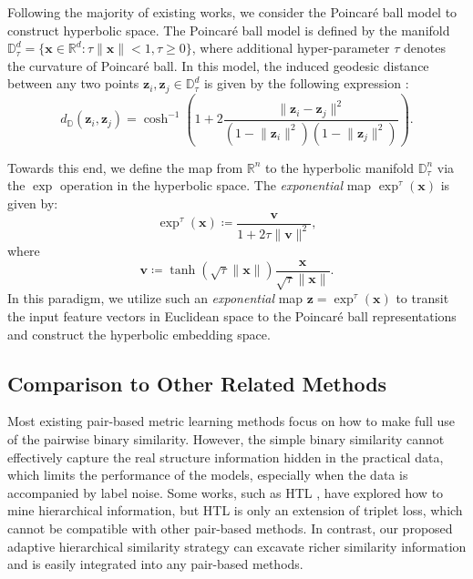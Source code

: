 \documentclass[lettersize,journal]{IEEEtran}
\begin{document}
Following the majority of existing works, we consider the Poincar{\'e} ball model to construct hyperbolic
space. The Poincar{\'e} ball model is defined by the manifold $\mathbb{D}_{\tau}^d = \lbrace \mathbf{x} \in \mathbb{R}^d: \tau\lVert\mathbf{x} \rVert < 1, \tau\geq 0\rbrace$, where additional hyper-parameter $\tau$ denotes    the curvature of Poincar{\'e} ball. In this model, the induced geodesic distance between any two points $\mathbf{z}_i, \mathbf{z}_j \in \mathbb{D}_{\tau}^d$  is given by the following expression \cite{nickel2017poincare}:
\begin{equation}
	d_{\mathbb{D}}(\mathbf{z}_i,\mathbf{z}_j) = \cosh^{-1}\left( 1 + 2\frac{\lVert \mathbf{z}_i - \mathbf{z}_j \rVert^2}{(1- \lVert \mathbf{z}_i\rVert^2)(1- \lVert \mathbf{z}_j\rVert^2)} \right).
\end{equation}

Towards this end, we define the  map from $\mathbb{R}^n$ to the hyperbolic manifold $\mathbb{D}^n_{\tau}$ via the $\exp$ operation in the hyperbolic space. The \textit{exponential} map $\exp^{\tau}(\mathbf{x})$ is given by:
\begin{equation}
	\exp^{\tau}(\mathbf{x}) \coloneqq \frac{\mathbf{v}}{1+2\tau\lVert\mathbf{v}\rVert^2},           
\end{equation}
where
\begin{equation}
	\mathbf{v} \coloneqq \tanh\left( \sqrt{\tau}\lVert \mathbf{x}\rVert \right)\frac{\mathbf{x}}{\sqrt{\tau}\lVert\mathbf{x}\rVert}. 
\end{equation}
In this paradigm,  we utilize such an \textit{exponential} map $\mathbf{z} = \exp^{\tau}(\mathbf{x})$ to transit the input feature vectors in Euclidean space to the Poincar{\'e} ball representations and construct the hyperbolic embedding space.


\subsection{Comparison to Other Related Methods}
Most existing pair-based metric learning methods focus on how to make full use of the pairwise binary similarity. However, the simple binary similarity cannot effectively capture the real structure information hidden in the practical data,
which limits the performance of the models, especially when the data is accompanied by label noise. Some works, such as HTL \cite{ge2018deep}, have explored how to mine hierarchical information, but HTL is only an extension of triplet loss, which cannot be compatible with other pair-based methods. In contrast, our proposed adaptive hierarchical similarity strategy can excavate richer similarity information and is easily integrated into any pair-based methods.
\end{document}
